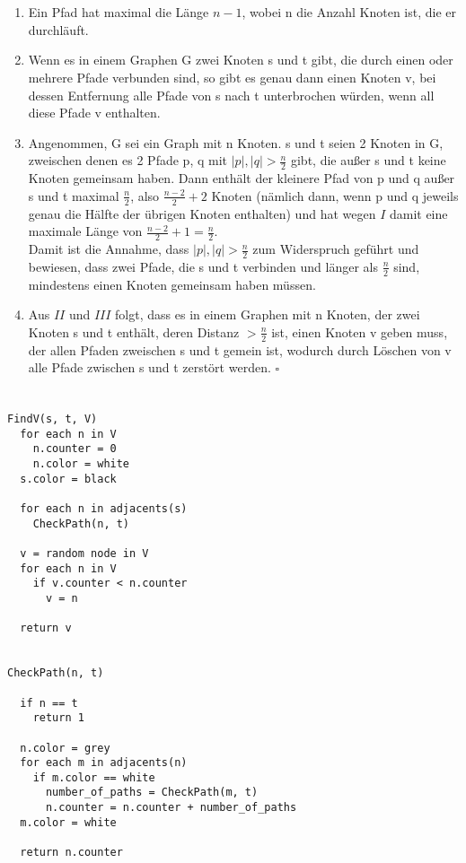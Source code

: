 \documentclass[fleqn]{article}
\begin{document}
\section{}%
\begin{enumerate}[I]
  \item Ein Pfad hat maximal die Länge $n-1$, wobei n die Anzahl Knoten ist, die er durchläuft.
  \item Wenn es in einem Graphen G zwei Knoten s und t gibt, die durch einen oder mehrere  Pfade verbunden sind, so gibt es genau dann einen Knoten v, bei dessen Entfernung alle Pfade von s nach t unterbrochen würden, wenn all diese Pfade v enthalten.
  \item Angenommen, G sei ein Graph mit n Knoten. s und t seien 2 Knoten in G, zweischen denen es 2 Pfade p, q mit $|p|,|q| > \frac{n}{2}$ gibt, die außer s und t keine Knoten gemeinsam haben. Dann enthält der kleinere Pfad von p und q außer s und t maximal $\frac{n}{2}$, also $\frac{n - 2}{2} + 2$ Knoten (nämlich dann, wenn p und q jeweils genau die Hälfte der übrigen Knoten enthalten) und hat wegen $I$ damit eine maximale Länge von $\frac{n - 2}{2} + 1 = \frac{n}{2}$.\\
  Damit ist die Annahme, dass $|p|,|q| > \frac{n}{2}$ zum Widerspruch geführt und bewiesen, dass zwei Pfade, die s und t verbinden und länger als $\frac{n}{2}$ sind, mindestens einen Knoten gemeinsam haben müssen.
  \item Aus $II$ und $III$ folgt, dass es in einem Graphen mit n Knoten, der zwei Knoten s und t enthält, deren Distanz $> \frac{n}{2}$ ist, einen Knoten v geben muss, der allen Pfaden zweischen s und t gemein ist, wodurch durch Löschen von v alle Pfade zwischen s und t zerstört werden. $\square$
\end{enumerate}

\section{}%
\begin{lstlisting}
FindV(s, t, V)
  for each n in V
    n.counter = 0
    n.color = white
  s.color = black
  
  for each n in adjacents(s)
    CheckPath(n, t)
    
  v = random node in V
  for each n in V
    if v.counter < n.counter
      v = n
  
  return v
  
  
CheckPath(n, t)
  
  if n == t
    return 1

  n.color = grey
  for each m in adjacents(n)
    if m.color == white 
      number_of_paths = CheckPath(m, t)
      n.counter = n.counter + number_of_paths
  m.color = white
  
  return n.counter
  
\end{lstlisting}
\end{document}
